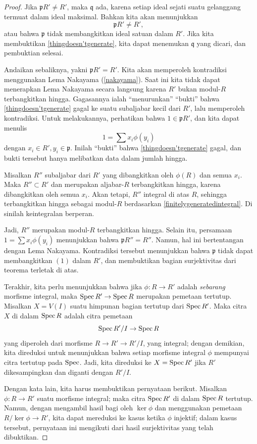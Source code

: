 \begin{proof}
Jika $\mathfrak{p}R' \neq R'$, maka
$\mathfrak{q}$ ada, karena setiap ideal sejati suatu gelanggang termuat dalam
ideal maksimal. Bahkan kita akan menunjukkan
\begin{equation} \label{thingdoesn'tgenerate} \mathfrak{p} R' \neq R',
\end{equation}
atau bahwa $\mathfrak{p}$ tidak membangkitkan ideal satuan dalam $R'$.
Jika kita membuktikan \eqref{thingdoesn'tgenerate}, kita dapat menemukan
$\mathfrak{q}$ yang dicari, dan pembuktian selesai.

Andaikan
sebaliknya, yakni $\mathfrak{p}R' = R'$. Kita akan memperoleh kontradiksi menggunakan
Lema Nakayama (\cref{nakayama}). 
Saat ini kita tidak dapat menerapkan Lema Nakayama secara langsung karena $R'$ bukan
modul-$R$ terbangkitkan hingga. Gagasannya ialah “menurunkan” “bukti” bahwa 
\eqref{thingdoesn'tgenerate} gagal ke suatu subaljabar kecil dari $R'$, lalu
memperoleh kontradiksi.
Untuk melakukannya, perhatikan bahwa $1 \in \mathfrak{p}R'$, dan kita dapat menulis
\[ 1 = \sum x_i \phi(y_i)  \]
dengan $x_i \in R', y_i \in \mathfrak{p}$.
Inilah “bukti” bahwa \eqref{thingdoesn'tgenerate} gagal, dan bukti tersebut
hanya melibatkan data dalam jumlah hingga. 

Misalkan $R''$ subaljabar dari $R'$ yang dibangkitkan oleh $\phi(R)$ dan semua $x_i$. Maka
$R'' \subset R'$ dan merupakan aljabar-$R$ terbangkitkan hingga, karena dibangkitkan oleh
semua $x_i$. Akan tetapi, $R''$ integral di atas $R$, sehingga terbangkitkan hingga sebagai
modul-$R$ berdasarkan \cref{finitelygeneratedintegral}. Di sinilah
keintegralan berperan.

Jadi, $R''$ merupakan modul-$R$ terbangkitkan hingga. Selain itu, persamaan
$1 = \sum x_i \phi(y_i)$ menunjukkan bahwa $\mathfrak{p}R'' = R''$. Namun, hal ini
bertentangan dengan Lema Nakayama. Kontradiksi tersebut menunjukkan bahwa
$\mathfrak{p}$ tidak dapat membangkitkan $(1)$ dalam $R'$, dan membuktikan bagian surjektivitas
dari teorema terletak di atas.

Terakhir, kita perlu menunjukkan bahwa jika $\phi: R \to R'$ adalah \emph{sebarang} morfisme
integral, maka $\operatorname{Spec} R' \to \operatorname{Spec} R$ merupakan pemetaan tertutup. Misalkan $X = V(I) $ suatu
himpunan bagian tertutup dari $\operatorname{Spec} R'$. Maka citra $X$ di dalam $\operatorname{Spec} R$ adalah citra
pemetaan
\[ \operatorname{Spec} R'/I \to \operatorname{Spec} R   \]
yang diperoleh dari morfisme $R \to R' \to  R'/I$, yang integral; dengan demikian, kita
direduksi untuk menunjukkan bahwa setiap morfisme integral $\phi$ mempunyai citra tertutup pada
$\operatorname{Spec}$. 
Jadi, kita direduksi ke $X = \operatorname{Spec} R'$ jika $R'$ dikesampingkan dan diganti dengan
$R'/I$.

Dengan kata lain, kita harus membuktikan pernyataan berikut. Misalkan $\phi: R \to R'$ suatu
morfisme integral; maka citra $\operatorname{Spec} R'$ di dalam $\operatorname{Spec} R$ tertutup.
Namun, dengan mengambil hasil bagi oleh $\ker \phi$ dan menggunakan pemetaan $R/\ker \phi \to R'$, kita
dapat mereduksi ke kasus ketika $\phi$ injektif; dalam kasus tersebut, pernyataan ini mengikuti
dari hasil surjektivitas yang telah dibuktikan.
\end{proof}

